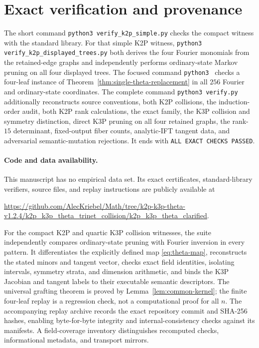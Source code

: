 \documentclass[11pt]{article}
\theoremstyle{remark}\newtheorem{remark}[theorem]{Remark}
\begin{document}
\section{Exact verification and provenance}
The short command \texttt{python3 verify\_k2p\_simple.py} checks the compact witness with the standard library. For that simple K2P witness, \texttt{python3 verify\_k2p\_displayed\_trees.py} both derives the four Fourier monomials from the retained-edge graphs and independently performs ordinary-state Markov pruning on all four displayed trees. The focused command \texttt{python3 } checks a four-leaf instance of Theorem~\ref{thm:single-theta-replacement} in all $256$ Fourier and ordinary-state coordinates. The complete command \texttt{python3 verify.py} additionally reconstructs source conventions, both K2P collisions, the induction-order audit, both K2P rank calculations, the exact family, the K3P collision and symmetry distinction, direct K3P pruning on all four retained graphs, the rank-$15$ determinant, fixed-output fiber counts, analytic-IFT tangent data, and adversarial semantic-mutation rejections. It ends with \texttt{ALL EXACT CHECKS PASSED}.

\paragraph{Code and data availability.}
This manuscript has no empirical data set. Its exact certificates, standard-library verifiers, source files, and replay instructions are publicly available at
\begin{center}
\url{https://github.com/AlecKriebel/Math/tree/k2p-k3p-theta-v1.2.4/k2p_k3p_theta_trinet_collision/k2p_k3p_theta_clarified}.
\end{center}
For the compact K2P and quartic K3P collision witnesses, the suite independently compares ordinary-state pruning with Fourier inversion in every pattern. It differentiates the explicitly defined map \eqref{eq:theta-map}, reconstructs the stated minors and tangent vector, checks exact field identities, isolating intervals, symmetry strata, and dimension arithmetic, and binds the K3P Jacobian and tangent labels to their executable semantic descriptors. The universal grafting theorem is proved by Lemma~\ref{lem:common-kernel}; the finite four-leaf replay is a regression check, not a computational proof for all $n$. The accompanying replay archive records the exact repository commit and SHA-256 hashes, enabling byte-for-byte integrity and internal-consistency checks against its manifests. A field-coverage inventory distinguishes recomputed checks, informational metadata, and transport mirrors.
\end{document}
